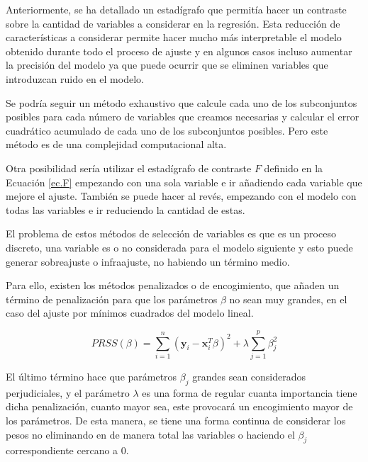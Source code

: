 \noindent Anteriormente, se ha detallado un estadígrafo que permitía hacer un contraste sobre la cantidad de variables a considerar en la regresión. 
Esta reducción de características a considerar permite hacer mucho más interpretable el modelo obtenido durante todo el proceso de ajuste y en algunos casos incluso aumentar la precisión del modelo ya que puede ocurrir que se eliminen variables que introduzcan ruido en el modelo. 

\noindent Se podría seguir un método exhaustivo que calcule cada uno de los subconjuntos posibles para cada número de variables que creamos necesarias y calcular el error cuadrático acumulado de cada uno de los subconjuntos posibles. Pero este método es de una complejidad computacional alta. 

\noindent Otra posibilidad sería utilizar el estadígrafo de contraste $F$ definido en la Ecuación \eqref{ec.F} empezando con una sola variable e ir añadiendo cada variable que mejore el ajuste. También se puede hacer al revés, empezando con el modelo con todas las variables e ir reduciendo la cantidad de estas. 

\noindent El problema de estos métodos de selección de variables es que es un proceso discreto, una variable es o no considerada para el modelo siguiente y esto puede generar sobreajuste o infraajuste, no habiendo un término medio. 

\noindent Para ello, existen los métodos penalizados o de encogimiento, que añaden un término de penalización para que los parámetros $\beta$ no sean muy grandes, en el caso del ajuste por mínimos cuadrados del modelo lineal. 

\begin{equation}
PRSS(\beta)=\sum_{i=1}^n(\textbf{y}_i-\textbf{x}_i^T\beta)^2+\lambda\sum_{j=1}^p\beta_j^2
\end{equation}

\noindent El último término hace que parámetros $\beta_j$ grandes sean considerados perjudiciales, y el parámetro $\lambda$ es una forma de regular cuanta importancia tiene dicha penalización, cuanto mayor sea, este provocará un encogimiento mayor de los parámetros. 
De esta manera, se tiene una forma continua de considerar los pesos no eliminando en de manera total las variables o haciendo el $\beta_j$ correspondiente cercano a 0. 















